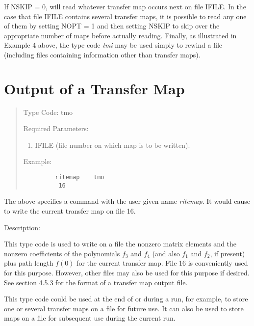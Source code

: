          If NSKIP = 0, \Mary will read whatever transfer map occurs next
on file IFILE.  In the case that file IFILE contains several transfer maps,
it is possible to read any one of them by setting NOPT = 1 and then setting
NSKIP to skip over the appropriate number of maps before actually reading.
Finally, as illustrated in Example 4 above, the type code {\em tmi } may be used
simply to rewind a file (including files containing information other than
transfer maps).

\newpage
\section{Output of a Transfer Map}
\begin{quotation}
\noindent Type Code:  tmo  
\vspace{5mm}

\noindent Required Parameters:
\begin{enumerate}
      \item IFILE (file number on which map is to be written).
\end{enumerate}

\vspace{5mm}
\noindent Example:
\begin{verbatim}
         ritemap    tmo
          16
\end{verbatim}
\end{quotation}
The above specifies a command with the user given name {\em ritemap}.  It would
cause \Mary to write the current transfer map on file 16.

\vspace{5mm}
     Description:
\vspace{2mm}

     This type code is used to write on a file the nonzero matrix
elements and the nonzero coefficients of the polynomials $f_3$  and $f_4$
(and also $f_1$ and $f_2$, if present) plus path length $f(0)$  for the
current transfer map.  File 16 is conveniently used for this purpose.
However, other files may also be used for this purpose if desired.  See
section 4.5.3 for the format of a transfer map output file.

         This type code could be used at the end of or during a \Mary
run, for example, to store one or several transfer maps on a file for
future use. It can also be used to store maps on a file for subsequent use
during the current \Mary run.

